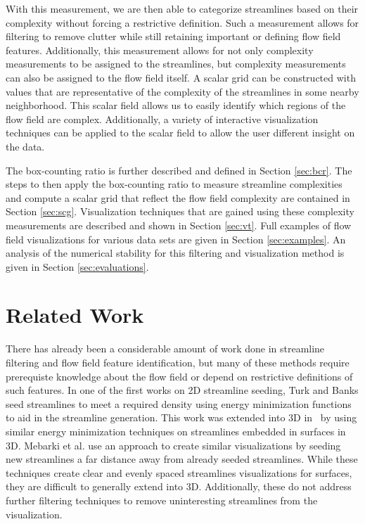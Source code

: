 \documentclass{egpubl}
\begin{document}
With this measurement, we are then able to categorize streamlines based on their complexity without forcing a restrictive definition.
Such a measurement allows for filtering to remove clutter while still retaining important or defining flow field features.
Additionally, this measurement allows for not only complexity measurements to be assigned to the streamlines, but complexity measurements can also be assigned to the flow field itself.
A scalar grid can be constructed with values that are representative of the complexity of the streamlines in some nearby neighborhood.
This scalar field allows us to easily identify which regions of the flow field are complex.
Additionally, a variety of interactive visualization techniques can be applied to the scalar field to allow the user different insight on the data.

The box-counting ratio is further described and defined in Section \ref{sec:bcr}.
The steps to then apply the box-counting ratio to measure streamline complexities and compute a scalar grid that reflect the flow field complexity are contained in Section \ref{sec:scg}.
Visualization techniques that are gained using these complexity measurements are described and shown in Section \ref{sec:vt}.
Full examples of flow field visualizations for various data sets are given in Section \ref{sec:examples}.
An analysis of the numerical stability for this filtering and visualization method is given in Section \ref{sec:evaluations}.

\section{Related Work}

There has already been a considerable amount of work done in streamline filtering and flow field feature identification, but many of these methods require prerequiste knowledge about the flow field or depend on restrictive definitions of such features.
In one of the first works on 2D streamline seeding, Turk and Banks \cite{turk} seed streamlines to meet a required density using energy minimization functions to aid in the streamline generation.
This work was extended into 3D in~\cite{mao} by using similar energy minimization techniques on streamlines embedded in surfaces in 3D.
Mebarki et al. \cite{mebarki} use an approach to create similar visualizations by seeding new streamlines a far distance away from already seeded streamlines.
While these techniques create clear and evenly spaced streamlines visualizations for surfaces, they are difficult to generally extend into 3D.
Additionally, these do not address further filtering techniques to remove uninteresting streamlines from the visualization.
\end{document}
